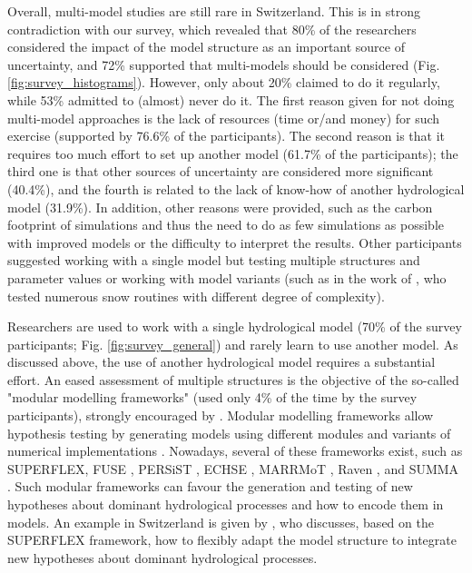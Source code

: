 \documentclass[10pt,a4paper]{article}
\begin{document}
Overall, multi-model studies are still rare in Switzerland. This is in strong contradiction with our survey, which revealed that 80\% of the researchers considered the impact of the model structure as an important source of uncertainty, and 72\% supported that multi-models should be considered (Fig. \ref{fig:survey_histograms}). However, only about 20\% claimed to do it regularly, while 53\% admitted to (almost) never do it. The first reason given for not doing multi-model approaches is the lack of resources (time or/and money) for such exercise (supported by 76.6\% of the participants). The second reason is that it requires too much effort to set up another model (61.7\% of the participants); the third one is that other sources of uncertainty are considered more significant (40.4\%), and the fourth is related to the lack of know-how of another hydrological model (31.9\%). In addition, other reasons were provided, such as the carbon footprint of simulations and thus the need to do as few simulations as possible with improved models or the difficulty to interpret the results. Other participants suggested working with a single model but testing multiple structures and parameter values or working with model variants (such as in the work of \citet{GironsLopez2020}, who tested numerous snow routines with different degree of complexity).

Researchers are used to work with a single hydrological model (70\% of the survey participants; Fig. \ref{fig:survey_general}) and rarely learn to use another model. As discussed above, the use of another hydrological model requires a substantial effort. An eased assessment of multiple structures is the objective of the so-called "modular modelling frameworks" (used only 4\% of the time by the survey participants), strongly encouraged by \citet{Clark2011a}. Modular modelling frameworks allow hypothesis testing by generating models using different modules and variants of numerical implementations \citep{LaFollette2021}. Nowadays, several of these frameworks exist, such as SUPERFLEX, FUSE \citep{Clark2008}, PERSiST \citep{Futter2014}, ECHSE \citep{Kneis2015}, MARRMoT \citep{Knoben2019}, Raven \citep{Craig2020}, and SUMMA \citep{Clark2015}. Such modular frameworks can favour the generation and testing of new hypotheses about dominant hydrological processes and how to encode them in models. An example in Switzerland is given by \citet{DalMolin2020}, who discusses, based on the SUPERFLEX framework, how to flexibly adapt the model structure to integrate new hypotheses about dominant hydrological processes. 
\end{document}
